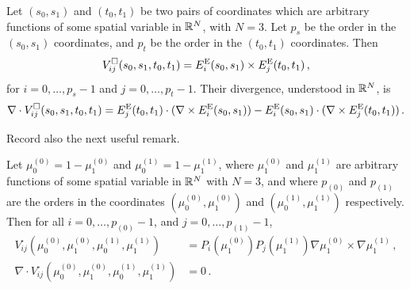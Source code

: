 \begin{definition*}
Let $(s_0,s_1)$ and $(t_0,t_1)$ be two pairs of coordinates which are arbitrary functions of some spatial variable in $\mathbb{R}^N$, with $N=3$. Let $p_s$ be the order in the $(s_0,s_1)$ coordinates, and $p_t$ be the order in the $(t_0,t_1)$ coordinates. Then
\begin{equation}
	V_{ij}^{\square}(s_0,s_1,t_0,t_1)=E_i^{\mathrm{E}}(s_0,s_1)\times E_j^{\mathrm{E}}(t_0,t_1)\,,
\end{equation}
for $i=0,\ldots,p_s-1$ and $j=0,\ldots,p_t-1$. Their divergence, understood in $\mathbb{R}^N$, is
\begin{equation}
	\nabla\cdot V_{ij}^{\square}(s_0,s_1,t_0,t_1)=E_j^{\mathrm{E}}(t_0,t_1)\cdot(\nabla\times E_i^{\mathrm{E}}(s_0,s_1))
		-E_i^{\mathrm{E}}(s_0,s_1)\cdot(\nabla\times E_j^{\mathrm{E}}(t_0,t_1)) \,.
\end{equation}
\end{definition*}

Record also the next useful remark.
\begin{remark}
Let $\mu_0^{(0)}=1-\mu_1^{(0)}$ and $\mu_0^{(1)}=1-\mu_1^{(1)}$, where $\mu_1^{(0)}$ and $\mu_1^{(1)}$ are arbitrary functions of some spatial variable in $\mathbb{R}^N$ with $N=3$, and where $p_{(0)}$ and $p_{(1)}$ are the orders in the coordinates $(\mu_0^{(0)},\mu_1^{(0)})$ and $(\mu_0^{(1)},\mu_1^{(1)})$ respectively. Then for all $i=0,\ldots,p_{(0)}-1$, and $j=0,\ldots,p_{(1)}-1$,
\begin{equation}
\begin{aligned}
	V_{ij}^\square(\mu_0^{(0)},\mu_1^{(0)},\mu_0^{(1)},\mu_1^{(1)})
		&=P_i(\mu_1^{(0)})P_j(\mu_1^{(1)})\nabla\mu_1^{(0)}\times\nabla\mu_1^{(1)}\,,\\
			\nabla\cdot V_{ij}^\square(\mu_0^{(0)},\mu_1^{(0)},\mu_0^{(1)},\mu_1^{(1)})&=0\,.
\end{aligned}
\label{eq:Vijsimplified}
\end{equation}
\end{remark}

